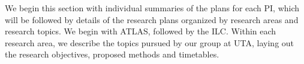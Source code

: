 
We begin this section with individual summaries of the plans for each PI, which will be followed by details of the research plans organized by research areas and research topics. We begin with ATLAS, followed by the ILC. Within each research area, we describe the topics pursued by our group at UTA, laying out the research objectives, proposed methods and timetables.

